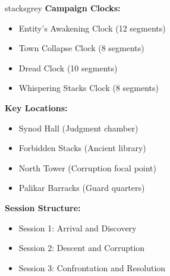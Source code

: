 \documentclass[11pt]{article}
\begin{document}
\begin{campaignsection}{stacksgrey}
\textbf{Campaign Clocks:}
\begin{itemize}
    \item Entity's Awakening Clock (12 segments)
    \item Town Collapse Clock (8 segments)
    \item Dread Clock (10 segments)
    \item Whispering Stacks Clock (8 segments)
\end{itemize}

\textbf{Key Locations:}
\begin{itemize}
    \item Synod Hall (Judgment chamber)
    \item Forbidden Stacks (Ancient library)
    \item North Tower (Corruption focal point)
    \item Palikar Barracks (Guard quarters)
\end{itemize}

\textbf{Session Structure:}
\begin{itemize}
    \item Session 1: Arrival and Discovery
    \item Session 2: Descent and Corruption
    \item Session 3: Confrontation and Resolution
\end{itemize}
\end{campaignsection}
\end{document}
